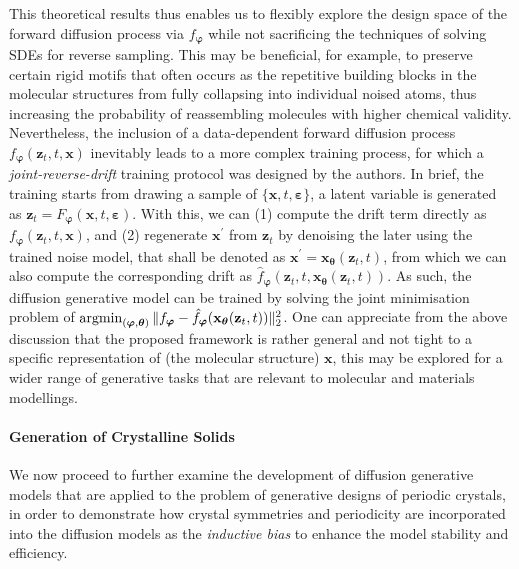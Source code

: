 This theoretical results thus enables us to flexibly explore the design space of the forward diffusion process via  $f_{\boldsymbol{\varphi}}$ while not sacrificing the techniques of solving SDEs for reverse sampling. This may be beneficial, for example, to preserve certain rigid motifs that often occurs as the repetitive building blocks in the molecular structures from fully collapsing into individual noised atoms, thus increasing the probability of reassembling molecules with higher chemical validity. Nevertheless, the inclusion of a data-dependent forward diffusion process $f_{\boldsymbol{\varphi}}(\bm{z}_t,t,\bm{x})$ inevitably leads to a more complex training process, for which a \emph{joint-reverse-drift} training protocol was designed by the authors. In brief, the training starts from drawing a sample of $\{\bm{x},t,\boldsymbol{\varepsilon}\}$, a latent variable is generated as $\bm{z}_t=F_{\boldsymbol{\varphi}}(\bm{x},t,\boldsymbol{\varepsilon})$. With this, we can (1) compute the drift term directly as $f_{\boldsymbol{\varphi}}(\bm{z}_t,t,\bm{x})$, and (2) regenerate $\bm{x}^\prime$ from $\bm{z}_t$ by denoising the later using the trained noise model, that shall be denoted as $\bm{x}^\prime=\bm{x}_{\boldsymbol{\theta}}(\bm{z}_t,t)$, from which we can also compute the corresponding drift as $\hat{f}_{\boldsymbol{\varphi}}\left(\bm{z}_t,t,\bm{x}_{\boldsymbol{\theta}}(\bm{z}_t,t) \right)$. As such, the diffusion generative model can be trained by solving the joint minimisation problem of $\operatorname*{argmin}_{(\boldsymbol{\varphi},\boldsymbol{\theta})}\Vert f_{\boldsymbol{\varphi}}-\hat{f}_{\boldsymbol{\varphi}}(\mathbf{x}_{\boldsymbol{\theta}}(\mathbf{z}_t,t))\Vert_2^2$. One can appreciate from the above discussion that the proposed framework is rather general and not tight to a specific representation of (the molecular structure) $\bm{x}$, this may be explored for a wider range of generative tasks that are relevant to molecular and materials modellings.

\paragraph{\textbf{Generation of Crystalline Solids}}
We now proceed to further examine the development of diffusion generative models that are applied to the problem of generative designs of periodic crystals, in order to demonstrate how crystal symmetries and periodicity are incorporated into the diffusion models as the \emph{inductive bias} to enhance the model stability and efficiency. 

